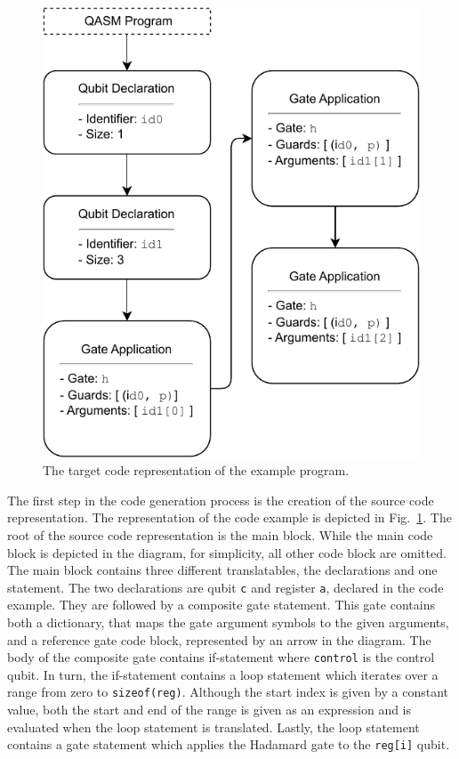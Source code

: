 \begin{figure}
\begin{minipage}{.45\textwidth}
        \includegraphics[width=\textwidth]{../figures/drawio/codeGen_targetCode_example.pdf}
        \caption{The target code representation of the example program.}    
        \label{fig:implementation_targetCodeRep_example}
    \end{minipage}
\end{figure}

The first step in the code generation process is the creation of the source code representation. The representation of the code example is depicted in Fig.~\ref{fig:implementation_targetCodeRep_example}. The root of the source code representation is the main block. While the main code block is depicted in the diagram, for simplicity, all other code block are omitted. The main block contains three different translatables, the declarations and one statement. The two declarations are qubit \texttt{c} and register \texttt{a}, declared in the code example. They are followed by a composite gate statement. This gate contains both a dictionary, that maps the gate argument symbols to the given arguments, and a reference gate code block, represented by an arrow in the diagram. The body of the composite gate contains if-statement where \texttt{control} is the control qubit. In turn, the if-statement contains a loop statement which iterates over a range from zero to \texttt{sizeof(reg)}. Although the start index is given by a constant value, both the start and end of the range is given as an expression and is evaluated when the loop statement is translated. Lastly, the loop statement contains a gate statement which applies the Hadamard gate to the \texttt{reg[i]} qubit.

